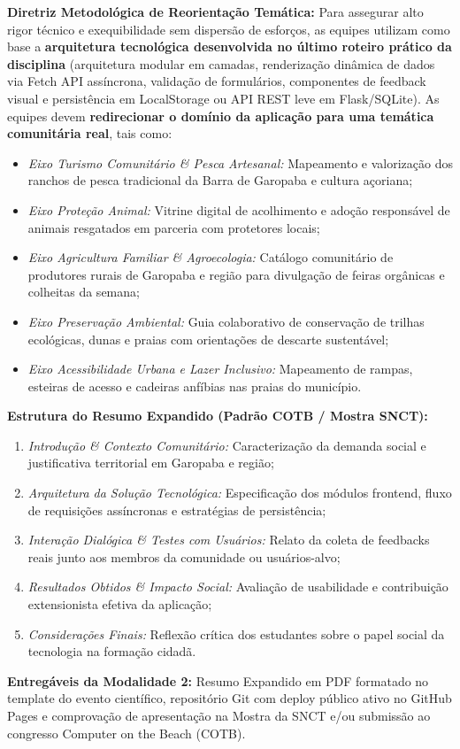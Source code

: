 \documentclass[12pt,a4paper]{article}
\begin{document}
\textbf{Diretriz Metodológica de Reorientação Temática:} Para assegurar alto rigor técnico e exequibilidade sem dispersão de esforços, as equipes utilizam como base a \textbf{arquitetura tecnológica desenvolvida no último roteiro prático da disciplina} (arquitetura modular em camadas, renderização dinâmica de dados via Fetch API assíncrona, validação de formulários, componentes de feedback visual e persistência em LocalStorage ou API REST leve em Flask/SQLite). As equipes devem \textbf{redirecionar o domínio da aplicação para uma temática comunitária real}, tais como:
\begin{itemize}[leftmargin=*]
    \item \textit{Eixo Turismo Comunitário \& Pesca Artesanal:} Mapeamento e valorização dos ranchos de pesca tradicional da Barra de Garopaba e cultura açoriana;
    \item \textit{Eixo Proteção Animal:} Vitrine digital de acolhimento e adoção responsável de animais resgatados em parceria com protetores locais;
    \item \textit{Eixo Agricultura Familiar \& Agroecologia:} Catálogo comunitário de produtores rurais de Garopaba e região para divulgação de feiras orgânicas e colheitas da semana;
    \item \textit{Eixo Preservação Ambiental:} Guia colaborativo de conservação de trilhas ecológicas, dunas e praias com orientações de descarte sustentável;
    \item \textit{Eixo Acessibilidade Urbana e Lazer Inclusivo:} Mapeamento de rampas, esteiras de acesso e cadeiras anfíbias nas praias do município.
\end{itemize}

\textbf{Estrutura do Resumo Expandido (Padrão COTB / Mostra SNCT):}
\begin{enumerate}[leftmargin=*]
    \item \textit{Introdução \& Contexto Comunitário:} Caracterização da demanda social e justificativa territorial em Garopaba e região;
    \item \textit{Arquitetura da Solução Tecnológica:} Especificação dos módulos frontend, fluxo de requisições assíncronas e estratégias de persistência;
    \item \textit{Interação Dialógica \& Testes com Usuários:} Relato da coleta de feedbacks reais junto aos membros da comunidade ou usuários-alvo;
    \item \textit{Resultados Obtidos \& Impacto Social:} Avaliação de usabilidade e contribuição extensionista efetiva da aplicação;
    \item \textit{Considerações Finais:} Reflexão crítica dos estudantes sobre o papel social da tecnologia na formação cidadã.
\end{enumerate}
\textbf{Entregáveis da Modalidade 2:} Resumo Expandido em PDF formatado no template do evento científico, repositório Git com deploy público ativo no GitHub Pages e comprovação de apresentação na Mostra da SNCT e/ou submissão ao congresso Computer on the Beach (COTB).
\end{document}
